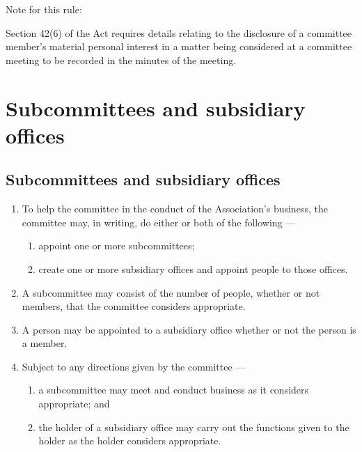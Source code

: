 \documentclass[../constitution.tex]{subfiles}
\begin{document}

Note for this rule: 

Section 42(6) of the Act requires details relating to the disclosure of a committee member's material personal interest in a matter being considered at a committee meeting to be recorded in the minutes of the meeting. 

\hypertarget{division-5-subcommittees-and-subsidiary-offices}{%
\section{Subcommittees and subsidiary offices}\label{division-5-subcommittees-and-subsidiary-offices}}

\hypertarget{subcommittees-and-subsidiary-offices}{%
\subsection{Subcommittees and subsidiary offices}\label{subcommittees-and-subsidiary-offices}}

\begin{enumerate}

\item To help the committee in the conduct of the Association's business, the committee may, in writing, do either or both of the following ---

  \begin{enumerate}
  
  \item appoint one or more subcommittees;
  \item create one or more subsidiary offices and appoint people to those offices.
  \end{enumerate}
\item A subcommittee may consist of the number of people, whether or not members, that the committee considers appropriate.
\item A person may be appointed to a subsidiary office whether or not the person is a member.
\item Subject to any directions given by the committee ---

  \begin{enumerate}
  
  \item a subcommittee may meet and conduct business as it considers appropriate; and
  \item the holder of a subsidiary office may carry out the functions given to the holder as the holder considers appropriate.
  \end{enumerate}
\end{enumerate}
\end{document}
